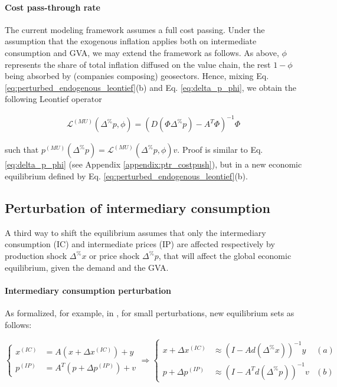 \documentclass{article}
\begin{document}
\paragraph{Cost pass-through rate} The current modeling framework assumes a full cost passing. Under the assumption that the exogenous inflation applies both on intermediate consumption and GVA, we may extend the framework as follows. As above, $\phi$ represents the share of total inflation diffused on the value chain, the rest $1 - \phi$ being absorbed by (companies composing) geosectors. Hence, mixing Eq. \eqref{eq:perturbed_endogenous_leontief}(b) and Eq. \eqref{eq:delta_p_phi}, we obtain the following Leontief operator

\begin{align}
\label{eq:perturbed_endogenous_leontief_phi}
    \mathcal{L}^{(MU)}(\Delta^\% p, \phi)  = \left( D(\Phi \Delta^\% p) - A^T \Phi \right)^{-1} \Phi
\end{align}

\noindent such that $p^{(MU)}(\Delta^\% p)=\mathcal{L}^{(MU)}(\Delta^\% p, \phi) v$. Proof is similar to Eq. \eqref{eq:delta_p_phi} (see Appendix \ref{appendix:ptr_costpush}), but in a new economic equilibrium defined by Eq. \eqref{eq:perturbed_endogenous_leontief}(b). 

\subsection{Perturbation of intermediary consumption}

A third way to shift the equilibrium assumes that only the intermediary consumption (IC) and intermediate prices (IP) are affected respectively by production shock $\Delta^\% x$ or price shock $\Delta^\% p$, that will affect the global economic equilibrium, given the demand and the GVA. 

\paragraph{Intermediary consumption perturbation} As formalized, for example, in \cite{desnos2023climate}, for small perturbations, new equilibrium sets as follows:

\begin{equation}
\label{eq:perturbed_intermediary_leontief}
    \left\{\begin{aligned}
     x^{(IC)} &= A \left (x + \Delta x^{(IC)} \right) + y \\ 
     p^{(IP)} &= A^T \left (p + \Delta p^{(IP)} \right) + v
    \end{aligned}\right. 
    \Longrightarrow
    \left\{\begin{aligned}
     x + \Delta x^{(IC)}  &\approx \left( I - A d(\Delta^\% x) \right)^{-1}y   & (a)\\ 
     p + \Delta p^{(IP)}  &\approx \left( I - A^T d(\Delta^\% p) \right)^{-1}v  & (b)
    \end{aligned}\right. 
\end{equation}
\end{document}
